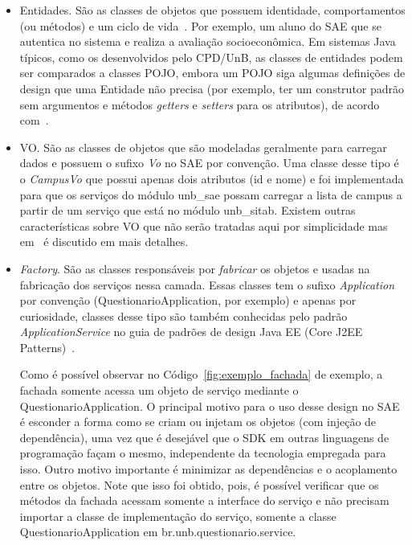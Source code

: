 	\begin{itemize}
	
		\item Entidades. São as classes de objetos que possuem 
						 identidade, comportamentos (ou métodos) 
						 e um ciclo de vida~\cite{evans2004domain}.
						 Por exemplo, 
						 um aluno do \acrshort{SAE}
						 que se autentica no sistema e realiza
						 a avaliação socioeconômica. Em sistemas Java 
						 típicos, como os desenvolvidos pelo CPD/UnB,
						 as classes de entidades podem 
						 ser comparados a classes \acrfull{POJO}, 
						 embora	um \acrshort{POJO} siga
						 algumas definições de design
						 que uma Entidade não precisa
						 (por exemplo,	ter um construtor padrão
						 sem argumentos e 
						 métodos \textit{getters} e \textit{setters}
						 para os atributos), 			 
						 de acordo com~\cite{kalin2013java}.


		\item \acrfull{VO}. São as classes de objetos
						que são modeladas geralmente para 
						carregar dados e
						possuem o sufixo \emph{Vo}
						no \acrshort{SAE} por convenção.
						Uma classe desse tipo é o
						\emph{CampusVo} que
						possui apenas dois atributos (id e nome)
						e foi implementada para que os serviços 
						do módulo unb\_sae possam carregar a 
						lista de campus a partir de um serviço
						que está no módulo unb\_sitab. Existem
						outras características sobre \acrshort{VO}
						que não serão tratadas aqui por simplicidade
						mas em~\cite{fowler2002patterns} 
						é discutido em mais detalhes.
						
						

		\item \textit{Factory}. São as classes responsáveis
			por \emph{fabricar} os objetos e usadas
			na fabricação dos serviços nessa camada. 
			Essas classes tem 
			o sufixo \emph{Application} por convenção 
			(QuestionarioApplication, por exemplo)
			e apenas por curiosidade, classes desse tipo
			são também conhecidas pelo padrão
			\textit{ApplicationService} no guia de padrões
			de design Java EE (Core J2EE
			Patterns)~\cite{alur2003core}.
			
			Como é possível
			observar no Código~\ref{fig:exemplo_fachada} de exemplo,
			a fachada somente acessa um objeto de
			serviço mediante o QuestionarioApplication. 
			O principal motivo
			para o uso desse design
			no \acrshort{SAE} é esconder 
			a forma como se criam ou
			injetam os objetos (com injeção de dependência),
			uma vez que é desejável que o \acrshort{SDK}
			em outras linguagens de programação
			façam o mesmo,
			independente da tecnologia empregada para isso.
			Outro motivo importante é minimizar
			as dependências e o acoplamento entre os objetos. 
			Note que isso foi obtido, pois,
			é possível verificar que os métodos 
			da fachada acessam somente a interface 
			do serviço e não precisam importar 
			a classe de implementação do serviço,
			somente a classe QuestionarioApplication
			em br.unb.questionario.service.
		

\end{itemize}
